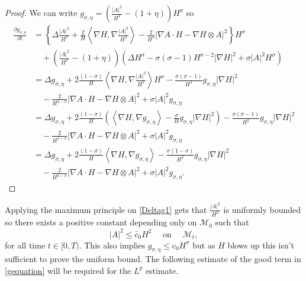 \begin{proof}
    We can write $ g_{\sigma, \eta } = \left( \frac{|A|^{2}}{H^{2}}- (1+ \eta) \right)H^{\sigma}  $ so \begin{align*}
        \frac{ \partial g_{\sigma, \eta}}{ \partial t} & = \left\{\Delta \frac{|A|^{2}}{H^{2}}+ \frac{2}{H} \left< \nabla H , \nabla \frac{ |A|^{2}}{H^{2}}\right>  - \frac{2}{H^{4}}|\nabla A \cdot H - \nabla H \otimes A|^{2} \right\}H^{\sigma} \\
        & \quad + \left( \frac{|A|^{2}}{H^{2}}- (1+ \eta) \right) \left( \Delta H^{\sigma} - \sigma(\sigma -1)H^{\sigma -2}|\nabla H|^{2} + \sigma |A|^{2}H^{\sigma } \right) \\
        & = \Delta g_{\sigma, \eta} +2\frac{(1-\sigma)}{H}\left< \nabla H, \nabla \frac{|A|^{2}}{H^{2}} \right>H^{\sigma}-\frac{\sigma(\sigma-1)}{H^{2}}g_{\sigma,\eta}|\nabla H|^{2} \\
        & \quad - \frac{2}{H^{4-\sigma}}|\nabla A \cdot H - \nabla H \otimes A|^{2} + \sigma|A|^{2}g_{\sigma,\eta} \\
        & = \Delta g_{\sigma,\eta} + 2\frac{(1-\sigma)}{H}\left(\left< \nabla H, \nabla g_{\sigma,\eta} \right> - \frac{\sigma}{H} g_{\sigma,\eta}| \nabla H|^{2}\right) - \frac{\sigma(\sigma-1)}{H^{2}}g_{\sigma,\eta}|\nabla H|^{2} \\
        & \quad - \frac{2}{H^{4-\sigma}}|\nabla A \cdot H - \nabla H \otimes A|^{2} + \sigma|A|^{2}g_{\sigma,\eta} \\
        & = \Delta g_{\sigma, \eta} + 2\frac{(1-\sigma)}{H}\left< \nabla H, \nabla g_{\sigma, \eta} \right> - \frac{\sigma (1-\sigma)}{H^{2}}g_{\sigma, \eta} | \nabla H|^{2} \\
        &  \quad - \frac{2}{H^{4-\sigma}}|\nabla A \cdot H - \nabla H \otimes A|^{2} + \sigma |A|^{2} g_{\sigma, \eta}.
    \end{align*}
\end{proof}

Applying the maximum principle on \cref{Deltag1} gets that $ \frac{|A|^{2}}{H^{2}} $ is uniformly bounded so there exists a positive constant depending only on $ \mathcal{M}_{0} $ such that 
\[ |A|^{2} \le \tilde{c_{0}}H^{2} \quad \text{ on } \quad \mathcal{M}_{t}, \]
for all time $ t \in [0,T) $. This also implies $ g_{\sigma, \eta} \le c_{0}H^{\sigma} $ but as $ H $ blows up this isn't sufficient to prove the uniform bound.
The following estimate of the good term in \cref{gequation} will be required for the $ L^{p} $ estimate. 

